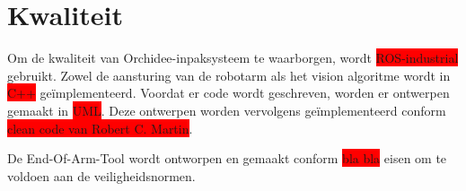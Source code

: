 \section{Kwaliteit}

Om de kwaliteit van Orchidee-inpaksysteem te waarborgen, wordt \colorbox{red}{ROS-industrial} gebruikt. 
Zowel de aansturing van de robotarm als het vision algoritme wordt in \colorbox{red}{C++} geïmplementeerd.
Voordat er code wordt geschreven, worden er ontwerpen gemaakt in \colorbox{red}{UML}.
Deze ontwerpen worden vervolgens geïmplementeerd conform \colorbox{red}{clean code van Robert C. Martin}.

De End-Of-Arm-Tool wordt ontworpen en gemaakt conform \colorbox{red}{bla bla} eisen om te voldoen aan de veiligheidsnormen.

\newpage